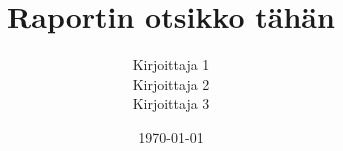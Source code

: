 \documentclass{watson}
\title{Raportin otsikko tähän}
\author{Kirjoittaja 1\\
        Kirjoittaja 2\\
        Kirjoittaja 3}
\date{\today}
\begin{document}
\maketitle
\tableofcontents
\newpage





\newpage
\begin{appendix}
  
\end{appendix}


\newpage
\printbibliography
\end{document}
